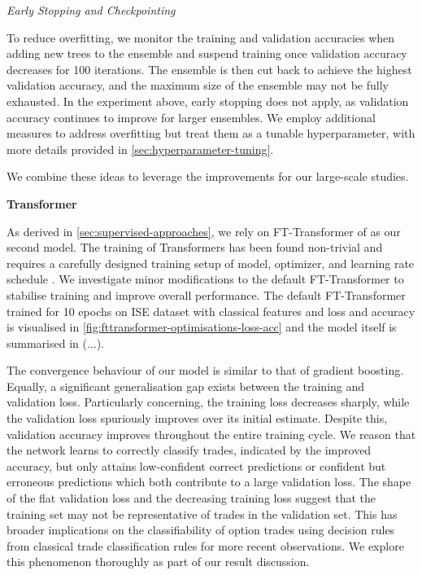 \emph{Early Stopping and Checkpointing}

To reduce overfitting, we monitor the training and validation accuracies when adding new trees to the ensemble and suspend training once validation accuracy decreases for 100 iterations. The ensemble is then cut back to achieve the highest validation accuracy, and the maximum size of the ensemble may not be fully exhausted. In the experiment above, early stopping does not apply, as validation accuracy continues to improve for larger ensembles. We employ additional measures to address overfitting but treat them as a tunable hyperparameter, with more details provided in \cref{sec:hyperparameter-tuning}.

We combine these ideas to leverage the improvements for our large-scale studies.

\textbf{Transformer}

As derived in \cref{sec:supervised-approaches}, we rely on FT-Transformer of \textcite[][4--5]{gorishniyRevisitingDeepLearning2021} as our second model. The training of Transformers has been found non-trivial and requires a carefully designed training setup of model, optimizer, and learning rate schedule \autocite[][1]{liuUnderstandingDifficultyTraining2020}. We investigate minor modifications to the default FT-Transformer to stabilise training and improve overall performance. The default FT-Transformer trained for 10 epochs on \gls{ISE} dataset with classical features and loss and accuracy is visualised in \cref{fig:fttransformer-optimisations-loss-acc} and the model itself is summarised in (...).

The convergence behaviour of our model is similar to that of gradient boosting. Equally, a significant generalisation gap exists between the training and validation loss. Particularly concerning, the training loss decreases sharply, while the validation loss spuriously improves over its initial estimate. Despite this, validation accuracy improves throughout the entire training cycle. We reason that the network learns to correctly classify trades, indicated by the improved accuracy, but only attains low-confident correct predictions or confident but erroneous predictions which both contribute to a large validation loss. The shape of the flat validation loss and the decreasing training loss suggest that the training set may not be representative of trades in the validation set. This has broader implications on the classifiability of option trades using decision rules from classical trade classification rules for more recent observations. We explore this phenomenon thoroughly as part of our result discussion.



